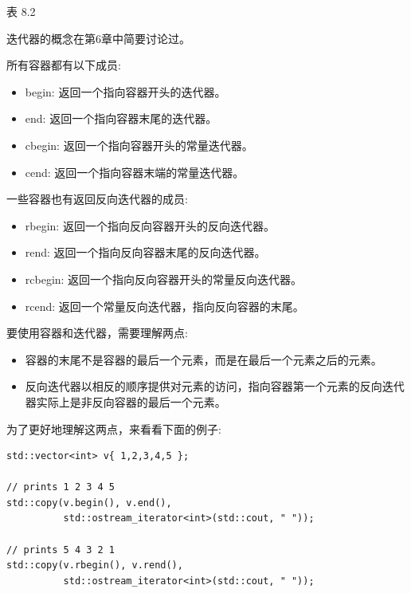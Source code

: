 \begin{center}
表 8.2
\end{center}

\begin{tcolorbox}[breakable,enhanced jigsaw,colback=blue!5!white,colframe=blue!75!black,title={重要的Note}]
迭代器的概念在第6章中简要讨论过。
\end{tcolorbox}

所有容器都有以下成员:

\begin{itemize}
\item
begin: 返回一个指向容器开头的迭代器。

\item
end: 返回一个指向容器末尾的迭代器。

\item
cbegin: 返回一个指向容器开头的常量迭代器。

\item
cend: 返回一个指向容器末端的常量迭代器。
\end{itemize}

一些容器也有返回反向迭代器的成员:

\begin{itemize}
\item
rbegin: 返回一个指向反向容器开头的反向迭代器。

\item
rend: 返回一个指向反向容器末尾的反向迭代器。

\item
rcbegin: 返回一个指向反向容器开头的常量反向迭代器。

\item
rcend: 返回一个常量反向迭代器，指向反向容器的末尾。
\end{itemize}

要使用容器和迭代器，需要理解两点:

\begin{itemize}
\item
容器的末尾不是容器的最后一个元素，而是在最后一个元素之后的元素。

\item
反向迭代器以相反的顺序提供对元素的访问，指向容器第一个元素的反向迭代器实际上是非反向容器的最后一个元素。
\end{itemize}

为了更好地理解这两点，来看看下面的例子:

\begin{lstlisting}[style=styleCXX]
std::vector<int> v{ 1,2,3,4,5 };

// prints 1 2 3 4 5
std::copy(v.begin(), v.end(),
		  std::ostream_iterator<int>(std::cout, " "));

// prints 5 4 3 2 1
std::copy(v.rbegin(), v.rend(),
		  std::ostream_iterator<int>(std::cout, " "));
\end{lstlisting}

